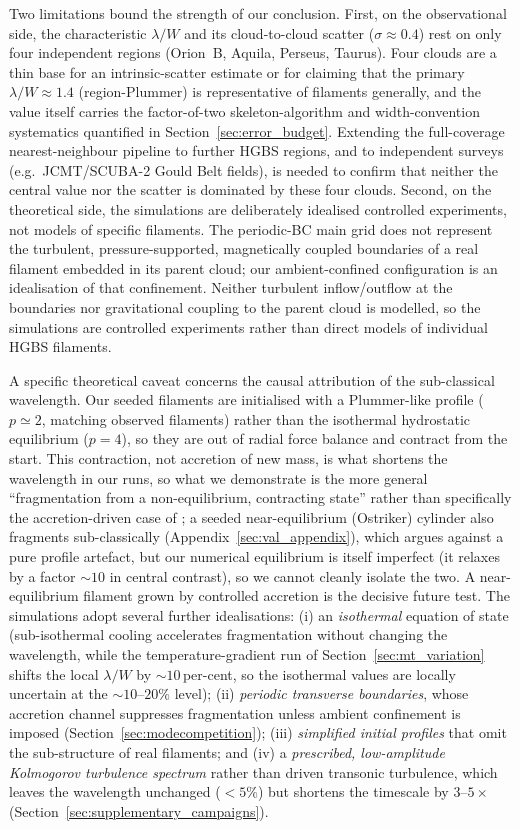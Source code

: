 \documentclass[usenatbib,twoside,twocolumn]{mnras}
\begin{document}
Two limitations bound the strength of our conclusion. First, on the observational side, the characteristic $\lambda/W$ and its cloud-to-cloud scatter ($\sigma\approx0.4$) rest on only four independent regions (Orion~B, Aquila, Perseus, Taurus). Four clouds are a thin base for an intrinsic-scatter estimate or for claiming that the primary $\lambda/W\approx1.4$ (region-Plummer) is representative of filaments generally, and the value itself carries the factor-of-two skeleton-algorithm and width-convention systematics quantified in Section~\ref{sec:error_budget}. Extending the full-coverage nearest-neighbour pipeline to further HGBS regions, and to independent surveys (e.g.\ JCMT/SCUBA-2 Gould Belt fields), is needed to confirm that neither the central value nor the scatter is dominated by these four clouds. Second, on the theoretical side, the simulations are deliberately idealised controlled experiments, not models of specific filaments. The periodic-BC main grid does not represent the turbulent, pressure-supported, magnetically coupled boundaries of a real filament embedded in its parent cloud; our ambient-confined configuration is an idealisation of that confinement. Neither turbulent inflow/outflow at the boundaries nor gravitational coupling to the parent cloud is modelled, so the simulations are controlled experiments rather than direct models of individual HGBS filaments.

A specific theoretical caveat concerns the causal attribution of the sub-classical wavelength. Our seeded filaments are initialised with a Plummer-like profile ($p\simeq2$, matching observed filaments) rather than the isothermal hydrostatic equilibrium ($p=4$), so they are out of radial force balance and contract from the start. This contraction, not accretion of new mass, is what shortens the wavelength in our runs, so what we demonstrate is the more general ``fragmentation from a non-equilibrium, contracting state'' rather than specifically the accretion-driven case of \citet{Clarke2016,Clarke2017}; a seeded near-equilibrium (Ostriker) cylinder also fragments sub-classically (Appendix~\ref{sec:val_appendix}), which argues against a pure profile artefact, but our numerical equilibrium is itself imperfect (it relaxes by a factor $\sim10$ in central contrast), so we cannot cleanly isolate the two. A near-equilibrium filament grown by controlled accretion is the decisive future test. The simulations adopt several further idealisations: (i) an \emph{isothermal} equation of state (sub-isothermal cooling accelerates fragmentation without changing the wavelength, while the temperature-gradient run of Section~\ref{sec:mt_variation} shifts the local $\lambda/W$ by $\sim10$\,per-cent, so the isothermal values are locally uncertain at the $\sim10$--$20\%$ level); (ii) \emph{periodic transverse boundaries}, whose accretion channel suppresses fragmentation unless ambient confinement is imposed (Section~\ref{sec:modecompetition}); (iii) \emph{simplified initial profiles} that omit the sub-structure of real filaments; and (iv) a \emph{prescribed, low-amplitude Kolmogorov turbulence spectrum} rather than driven transonic turbulence, which leaves the wavelength unchanged ($<5\%$) but shortens the timescale by $3$--$5\times$ (Section~\ref{sec:supplementary_campaigns}).
\end{document}
